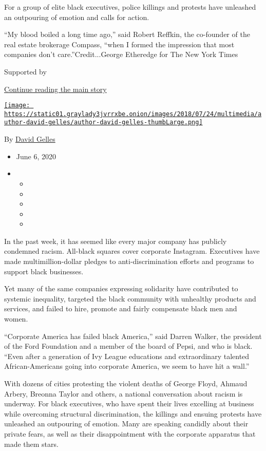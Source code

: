 For a group of elite black executives, police killings and protests have
unleashed an outpouring of emotion and calls for action.

``My blood boiled a long time ago,'' said Robert Reffkin, the co-founder
of the real estate brokerage Compass, ``when I formed the impression
that most companies don't care.''Credit...George Etheredge for The New
York Times

Supported by

\protect\hyperlink{after-sponsor}{Continue reading the main story}

\href{https://www.nytimes3xbfgragh.onion/by/david-gelles}{\texttt{[image: https://static01.graylady3jvrrxbe.onion/images/2018/07/24/multimedia/author-david-gelles/author-david-gelles-thumbLarge.png]}}

By \href{https://www.nytimes3xbfgragh.onion/by/david-gelles}{David
Gelles}

\begin{itemize}
\item
  June 6, 2020
\item
  \begin{itemize}
  \item
  \item
  \item
  \item
  \item
  \end{itemize}
\end{itemize}

In the past week, it has seemed like every major company has publicly
condemned racism. All-black squares cover corporate Instagram.
Executives have made multimillion-dollar pledges to anti-discrimination
efforts and programs to support black businesses.

Yet many of the same companies expressing solidarity have contributed to
systemic inequality, targeted the black community with unhealthy
products and services, and failed to hire, promote and fairly compensate
black men and women.

``Corporate America has failed black America,'' said Darren Walker, the
president of the Ford Foundation and a member of the board of Pepsi, and
who is black. ``Even after a generation of Ivy League educations and
extraordinary talented African-Americans going into corporate America,
we seem to have hit a wall.''

With dozens of cities protesting the violent deaths of George Floyd,
Ahmaud Arbery, Breonna Taylor and others, a national conversation about
racism is underway. For black executives, who have spent their lives
excelling at business while overcoming structural discrimination, the
killings and ensuing protests have unleashed an outpouring of emotion.
Many are speaking candidly about their private fears, as well as their
disappointment with the corporate apparatus that made them stars.

